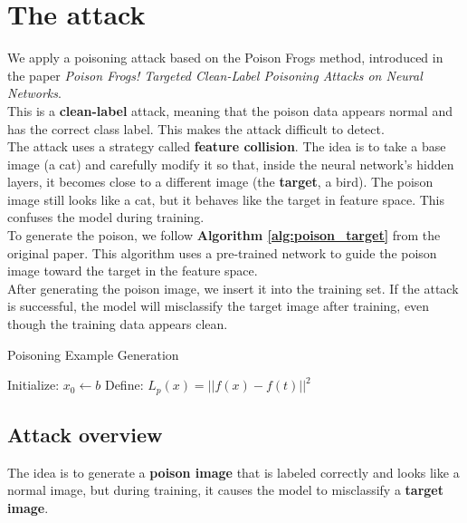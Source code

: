 \section{The attack}
We apply a poisoning attack based on the Poison Frogs method, introduced in the paper \textit{Poison Frogs! Targeted Clean-Label Poisoning Attacks on Neural Networks}.\\
This is a \textbf{clean-label} attack, meaning that the poison data appears normal and has the correct class label. This makes the attack difficult to detect.\\
The attack uses a strategy called \textbf{feature collision}. The idea is to take a base image (a cat) and carefully modify it so that, inside the neural network's hidden layers, it becomes close to a different image (the \textbf{target}, a bird). The poison image still looks like a cat, but it behaves like the target in feature space. This confuses the model during training.
\\
To generate the poison, we follow \textbf{Algorithm \ref{alg:poison_target}} from the original paper. This algorithm uses a pre-trained network to guide the poison image toward the target in the feature space.\\
After generating the poison image, we insert it into the training set. If the attack is successful, the model will misclassify the target image after training, even though the training data appears clean.\\

\begin{algorithm}[H]
    \caption{Poisoning Example Generation}
    \label{alg:poisoning_example}
    \BlankLine
    Initialize: $x_0 \leftarrow b$\;
    Define: $L_p(x) = ||f(x) - f(t)||^2$\;
    \label{alg:poison_target}
\end{algorithm}
\subsection{Attack overview}

The idea is to generate a \textbf{poison image} that is labeled correctly and looks like a normal image, but during training, it causes the model to misclassify a \textbf{target image}.

